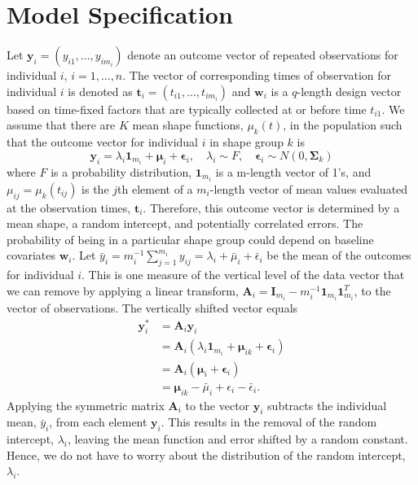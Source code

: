 \documentclass[12pt]{article}
\newcommand{\B}[0]{\mathbf}
\newcommand{\bs}[0]{\boldsymbol}
\begin{document}
\section{Model Specification}
 Let $\B y_{i}=(y_{i1},...,y_{im_{i}})$ denote an outcome vector of repeated observations for individual $i$, $i=1,...,n$. The vector of corresponding times of observation for individual $i$ is denoted as $\B t_{i}=(t_{i1},...,t_{im_{i}})$ and $\B w_{i}$ is a $q$-length design vector based on time-fixed factors that are typically collected at or before time $t_{i1}$. We assume that there are $K$ mean shape functions, $\mu_{k}(t)$, in the population such that the outcome vector for individual $i$ in shape group $k$ is
 $$\B y_{i} = \lambda_{i}\B 1_{m_{i}}+\bs\mu_{i}+\bs\epsilon_{i},\quad \lambda_{i}\sim F, \quad \bs\epsilon_{i}\sim N(0,\bs\Sigma_{k})$$
 where $F$ is a probability distribution, $\B 1_{m_{i}}$ is a m-length vector of 1's, and $\mu_{ij} = \mu_{k}(t_{ij})$ is the $j$th element of a $m_{i}$-length vector of mean values evaluated at the observation times, $\B t_{i}$. Therefore, this outcome vector is determined by a mean shape, a random intercept, and potentially correlated errors. The probability of being in a particular shape group could depend on baseline covariates $\B w_{i}$. Let $\bar{y}_{i}= m_{i}^{-1}\sum^{m_{i}}_{j=1} y_{ij} = \lambda_{i}+\bar{\mu}_{i}+\bar{\epsilon}_{i}$ be the mean of the outcomes for individual $i$. This is one measure of the vertical level of the data vector that we can remove by applying a linear transform, $\B A_{i} = \B I_{m_{i}} - m_{i}^{-1}\B 1_{m_{i}}\B 1_{m_{i}}^{T}$, to the vector of observations. The vertically shifted vector equals 
\begin{align*}
\B y^{*}_{i} &= \B A_{i}\B y_{i}\\
&=\B A_{i}(\lambda_{i}\B 1_{m_{i}}+\bs\mu_{ik}+\bs\epsilon_{i})\\
&=\B A_{i}(\bs\mu_{i}+\bs\epsilon_{i})\\
&=\bs\mu_{ik} - \bar{\mu}_{i}+\epsilon_{i}-\bar{\epsilon}_{i}.
\end{align*}
Applying the symmetric matrix $\B A_{i}$ to the vector $\B y_{i}$ subtracts the individual mean, $\bar{y}_{i}$, from each element $\B y_{i}$. This results in the removal of the random intercept, $\lambda_{i}$, leaving the mean function and error shifted by a random constant. Hence, we do not have to worry about the distribution of the random intercept, $\lambda_{i}$.
\end{document}

